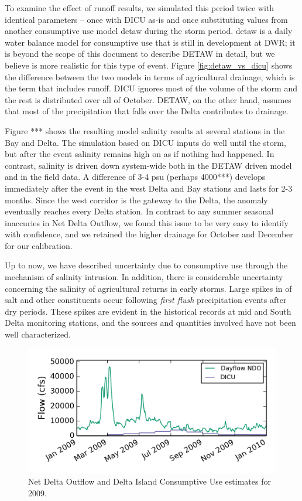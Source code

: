 To examine the effect of runoff results, we simulated this period twice with identical parameters --  
once with DICU as-is and once substituting values from another consumptive use model \acrshort{detaw} during the storm period.
 \acrlong{detaw} is a daily water balance model for consumptive use that is still in development at DWR; it
is beyond the scope of this document to describe DETAW in detail, but we believe is more realistic for this type of event. 
Figure \ref{fig:detaw_vs_dicu} shows the difference between the two models in terms of agricultural drainage, which 
is the term that includes runoff. DICU ignores most of the volume of the storm and the rest is distributed over all of October.
DETAW, on the other hand, assumes that most of the precipitation that falls over the Delta contributes to drainage.

Figure *** shows the resulting model salinity results at several stations in the Bay and Delta. The simulation
based on DICU inputs do well until the storm, but after the event salinity remains high on as if nothing had happened. In 
contrast, salinity is driven down system-wide both in the DETAW driven model and in the field data. A difference of
3-4 psu (perhaps 4000***) develops immediately after the event in the west Delta and Bay stations and lasts for 2-3 months. 
Since the west corridor is the gateway to the Delta, the anomaly eventually reaches every Delta station. In contrast to 
any summer seasonal inaccuries in Net Delta Outflow, we found this issue to be very easy to identify with confidence, and we
retained the higher drainage for October and December for our calibration.

Up to now, we have described uncertainty due to consumptive use through the mechanism of salinity intrusion.
In addition, there is considerable uncertainty concerning the salinity of agricultural returns in early storms. 
Large spikes in of salt and other constituents occur following {\em first flush} precipitation 
events after dry periods. These spikes are evident in the historical records at mid and South Delta monitoring stations, and the sources and quantities involved have not been well characterized.

\begin{figure}
	\centering
		\includegraphics{image/ndo_vs_dicu}
	\caption{Net Delta Outflow and Delta Island Consumptive Use estimates for 2009.}
	\label{fig:ndo_vs_dicu}
\end{figure}

